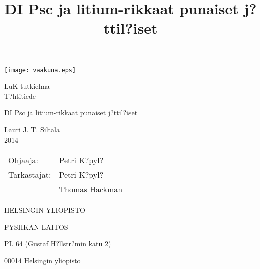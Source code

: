 \documentclass[11pt,a4paper,twoside]{report}
\begin{document}
\begin{titlepage}
\setcounter{page}{1}

\begin{center}

\vspace*{4cm}
\texttt{[image: vaakuna.eps]}

\vspace*{2cm}

LuK-tutkielma \\
T?htitiede

\vspace{2.0cm} 
{\Large \bf
  \rule{0pt}{3ex}DI Psc ja litium-rikkaat punaiset j?ttil?iset
}

\title{
 DI Psc ja litium-rikkaat punaiset j?ttil?iset
}

\vspace{2.0cm} 
Lauri J. T. Siltala \\
2014

\vspace{1.5cm} 
\begin{tabular}{ll}	Ohjaaja: & 	Petri K?pyl? \\ 
			Tarkastajat: &	Petri K?pyl? \\
				     &	Thomas Hackman
\end{tabular}

\vspace{1.5cm} HELSINGIN YLIOPISTO

FYSIIKAN LAITOS

\vspace{0.5cm} PL 64 (Gustaf H?llstr?min katu 2)

00014 Helsingin yliopisto

\end{center}

\end{titlepage}
\end{document}
